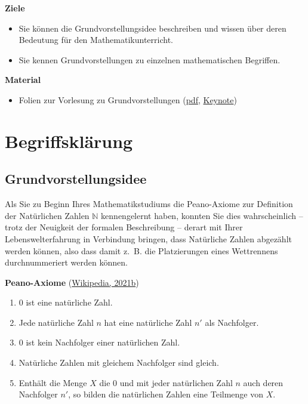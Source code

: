 \documentclass[
]{scrbook}
\providecommand{\tightlist}{%
  \setlength{\itemsep}{0pt}\setlength{\parskip}{0pt}}
\renewenvironment{quote}{
  \list{}{
	\leftmargin0.2cm   %
    \rightmargin\leftmargin
      	\def\FrameCommand
    {%
        {\color{quoteColor}\vrule width 2pt}%
        \hspace{0pt}%
    }%
    \MakeFramed{\advance \hsize -\width \FrameRestore}    \color{quoteColor}
    }
  \item\relax
}
{\endlist\color{black}\endMakeFramed}
\theoremstyle{definition}
\theoremstyle{definition}
\theoremstyle{definition}
\theoremstyle{definition}
\theoremstyle{remark}
\begin{document}
\begin{quote}
\textbf{Ziele}

\begin{itemize}
\tightlist
\item
  Sie können die Grundvorstellungsidee beschreiben und wissen über deren Bedeutung für den Mathematikunterricht.
\item
  Sie kennen Grundvorstellungen zu einzelnen mathematischen Begriffen.
\end{itemize}

\textbf{Material}

\begin{itemize}
\tightlist
\item
  Folien zur Vorlesung zu Grundvorstellungen (\href{files/Stoffdidaktik-WiSe2223-Kap3.pdf}{pdf}, \href{files/Stoffdidaktik-WiSe2223-Kap3.key}{Keynote})
\end{itemize}
\end{quote}

\hypertarget{grundvorstellungen-begriffsklaerung}{%
\section{Begriffsklärung}\label{grundvorstellungen-begriffsklaerung}}

\hypertarget{grundvorstellungsidee}{%
\subsection{Grundvorstellungsidee}\label{grundvorstellungsidee}}

Als Sie zu Beginn Ihres Mathematikstudiums die Peano-Axiome zur Definition der Natürlichen Zahlen \(\mathbb{N}\) kennengelernt haben, konnten Sie dies wahrscheinlich -- trotz der Neuigkeit der formalen Beschreibung -- derart mit Ihrer Lebenswelterfahrung in Verbindung bringen, dass Natürliche Zahlen abgezählt werden können, also dass damit z.~B. die Platzierungen eines Wettrennens durchnummeriert werden können.

\begin{quote}
\textbf{Peano-Axiome} (\protect\hyperlink{ref-WikiPeano}{Wikipedia, 2021b})

\begin{enumerate}
\def\labelenumi{\arabic{enumi}.}
\tightlist
\item
  \(0\) ist eine natürliche Zahl.
\item
  Jede natürliche Zahl \(n\) hat eine natürliche Zahl \(n'\) als Nachfolger.
\item
  \(0\) ist kein Nachfolger einer natürlichen Zahl.
\item
  Natürliche Zahlen mit gleichem Nachfolger sind gleich.
\item
  Enthält die Menge \(X\) die \(0\) und mit jeder natürlichen Zahl \(n\) auch deren Nachfolger \(n'\), so bilden die natürlichen Zahlen eine Teilmenge von \(X\).
\end{enumerate}
\end{quote}
\end{document}
